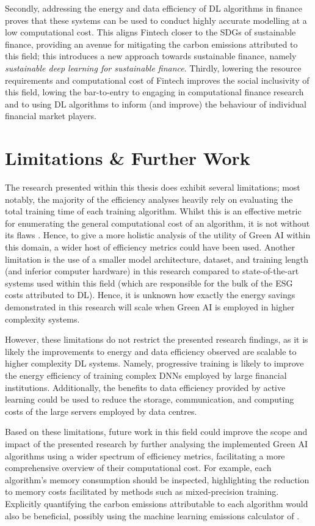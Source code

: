 \documentclass[a4paper, 11pt]{report}
\begin{document}
    Secondly, addressing the energy and data efficiency of DL algorithms in finance proves that these systems can be used to conduct highly accurate modelling at a low computational cost. This aligns Fintech closer to the SDGs of sustainable finance, providing an avenue for mitigating the carbon emissions attributed to this field; this introduces a new approach towards sustainable finance, namely \emph{sustainable deep learning for sustainable finance}. Thirdly, lowering the resource requirements and computational cost of Fintech improves the social inclusivity of this field, lowing the bar-to-entry to engaging in computational finance research and to using DL algorithms to inform (and improve) the behaviour of individual financial market players.


    \section{Limitations \& Further Work}

    The research presented within this thesis does exhibit several limitations; most notably, the majority of the efficiency analyses heavily rely on evaluating the total training time of each training algorithm. Whilst this is an effective metric for enumerating the general computational cost of an algorithm, it is not without its flaws \citep{schwartz-2019}. Hence, to give a more holistic analysis of the utility of Green AI within this domain, a wider host of efficiency metrics could have been used. Another limitation is the use of a smaller model architecture, dataset, and training length (and inferior computer hardware) in this research compared to state-of-the-art systems used within this field (which are responsible for the bulk of the ESG costs attributed to DL). Hence, it is unknown how exactly the energy savings demonstrated in this research will scale when Green AI is employed in higher complexity systems. 

    However, these limitations do not restrict the presented research findings, as it is likely the improvements to energy and data efficiency observed are scalable to higher complexity DL systems. Namely, progressive training is likely to improve the energy efficiency of training complex DNNs employed by large financial institutions. Additionally, the benefits to data efficiency provided by active learning could be used to reduce the storage, communication, and computing costs of the large servers employed by data centres.

    Based on these limitations, future work in this field could improve the scope and impact of the presented research by further analysing the implemented Green AI algorithms using a wider spectrum of efficiency metrics, facilitating a more comprehensive overview of their computational cost. For example, each algorithm's memory consumption should be inspected, highlighting the reduction to memory costs facilitated by methods such as mixed-precision training. Explicitly quantifying the carbon emissions attributable to each algorithm would also be beneficial, possibly using the machine learning emissions calculator of \citet{lacoste-2019}.
\end{document}
